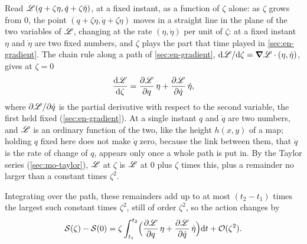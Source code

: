 \begin{toolbox}
Read $\mathscr{L}(q + \zeta\eta, \dot{q} + \zeta\dot\eta)$, at a fixed instant,
as a function of $\zeta$ alone: as $\zeta$ grows from 0, the point $(q +
\zeta\eta, \dot q + \zeta\dot\eta)$ moves in a straight line in the
plane of the two variables of $\mathscr{L}$, changing at the rate $(\eta, \dot
\eta)$ per unit of $\zeta$: at a fixed instant $\eta$ and $\dot\eta$ are
two fixed numbers, and $\zeta$ plays the part that time played in
\cref{sec:en-gradient}.
The chain rule along a path of \cref{sec:en-gradient}, $\mathrm{d}\mathscr{L}/\mathrm{d}\zeta
= \bm{\nabla}\mathscr{L}\cdot(\eta, \dot\eta)$, gives at $\zeta = 0$
\begin{equation*}
   \frac{\mathrm{d}\mathscr{L}}{\mathrm{d}\zeta} = \frac{\partial\mathscr{L}}{\partial q}\,\eta
   + \frac{\partial\mathscr{L}}{\partial\dot{q}}\,\dot\eta ,
\end{equation*}
where $\partial\mathscr{L}/\partial\dot q$ is the partial derivative with respect
to the second variable, the first held fixed (\cref{sec:en-gradient}).
At a single instant $q$ and $\dot q$ are two numbers, and $\mathscr{L}$ is an
ordinary function of the two, like the height $h(x, y)$ of a map; holding
$q$ fixed here does not make $\dot q$ zero, because the link between them,
that $\dot q$ is the rate of change of $q$, appears only once a whole path
is put in. By
the Taylor series (\cref{sec:mo-taylor}), $\mathscr{L}$ at $\zeta$ is $\mathscr{L}$ at 0
plus $\zeta$ times this, plus a remainder no larger than a
constant times $\zeta^2$.
\end{toolbox}

Integrating over the path, these remainders add up to at most $(t_2 -
t_1)$ times the largest such constant times $\zeta^2$, still of order
$\zeta^2$, so the action changes by
\begin{equation*}
   \mathcal{S}(\zeta) - \mathcal{S}(0) = \zeta\int_{t_1}^{t_2}\Bigl(\frac{\partial\mathscr{L}}
   {\partial q}\,\eta + \frac{\partial\mathscr{L}}{\partial\dot{q}}\,\dot\eta
   \Bigr)\mathrm{d} t + \mathcal{O}(\zeta^2) .
\end{equation*}

